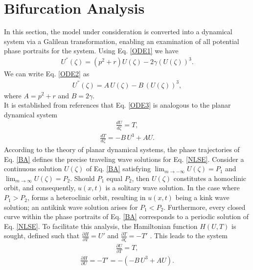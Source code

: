 \documentclass{article}
\numberwithin{equation}{section}
\begin{document}
\section{Bifurcation Analysis}
In this section, the model under consideration is converted into a dynamical system via a Galilean transformation, enabling an examination of all potential phase portraits for the system. Using Eq. \ref{ODE1} we have
\begin{eqnarray}\label{ODE2}
U^{''}{(\zeta)}=\left(p^{2}+r \right) U \! \left(\zeta \right)-2 \gamma \! \left(U \! \left(\zeta \right)\right)^{3}.
\end{eqnarray}
We can write Eq. \ref{ODE2} as
\begin{eqnarray}\label{ODE3}
U^{''}{(\zeta)}=A\,U \! \left(\zeta \right)-B\,\! \left(U \! \left(\zeta \right)\right)^{3},
\end{eqnarray}
where $A={p^2+r}$ and $B={2\gamma}$.\\
It is established from references \cite{a34,a35} that Eq. \ref{ODE3} is analogous to the planar dynamical system\\
\begin{eqnarray}\label{BA}
\frac{d U}{d \zeta} = T,\nonumber
\end{eqnarray}
\begin{eqnarray}
\frac{d T}{d \zeta} = -B \,U^{3}+A U.
\end{eqnarray}
According to the theory of planar dynamical systems, the phase trajectories of Eq. \ref{BA} defines the precise traveling wave solutions for Eq. \ref{NLSE}. Consider a continuous solution $U(\zeta)$ of Eq. \ref{BA} satisfying ${\lim_{m\longrightarrow-\infty}U(\zeta)=P_{1}}$ and ${\lim_{m\longrightarrow\infty}U(\zeta)=P_{2}}$. Should $P_{1}$ equal $P_{2}$, then $U(\zeta)$ constitutes a homoclinic orbit, and consequently, $u(x, t)$ is a solitary wave solution. In the case where $P_{1} > P_{2}$,  forms a heteroclinic orbit, resulting in $u(x, t)$ being a kink wave solution; an antikink wave solution arises for  $P_{1} < P_{2}$. Furthermore, every closed curve within the phase portraits of Eq. \ref{BA}  corresponds to a periodic solution of Eq. \ref{NLSE}. To facilitate this analysis, the Hamiltonian function $H(U, T)$ is sought, defined such that $\frac{\partial H}{\partial T} = \mathit{U'}$  and $\frac{\partial T}{\partial \zeta} = -\mathit{T'}$ . This leads to the system
\begin{eqnarray}
\frac{\partial U}{\partial T} = T,\nonumber
\end{eqnarray}
\begin{eqnarray}
\frac{\partial H}{\partial U} =-T'= -(-B \,U^{3}+A U).
\end{eqnarray}
\end{document}
